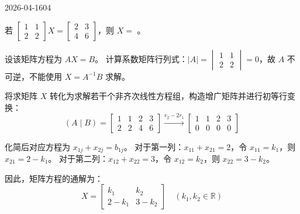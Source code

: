 \begin{mistake}{2026-04-16}{04}

\begin{problemcontent}
若 \(\begin{bmatrix} 1 & 1 \\ 2 & 2 \end{bmatrix} X = \begin{bmatrix} 2 & 3 \\ 4 & 6 \end{bmatrix}\)，则 \(X =\) \underline{\hspace{3cm}}。
\end{problemcontent}

\begin{solutioncontent}
设该矩阵方程为 \(AX=B\)。
计算系数矩阵行列式：\(|A| = \begin{vmatrix} 1 & 1 \\ 2 & 2 \end{vmatrix} = 0\)，故 \(A\) 不可逆，不能使用 \(X = A^{-1}B\) 求解。

将求矩阵 \(X\) 转化为求解若干个非齐次线性方程组，构造增广矩阵并进行初等行变换：
\[
(A \mid B) = \left[\begin{array}{cc|cc}
1 & 1 & 2 & 3 \\
2 & 2 & 4 & 6
\end{array}\right]
\xrightarrow{r_2 - 2r_1}
\left[\begin{array}{cc|cc}
1 & 1 & 2 & 3 \\
0 & 0 & 0 & 0
\end{array}\right]
\]

化简后对应方程为 \(x_{1j} + x_{2j} = b_{1j}\)。
对于第一列：\(x_{11} + x_{21} = 2\)，令 \(x_{11} = k_1\)，则 \(x_{21} = 2 - k_1\)。
对于第二列：\(x_{12} + x_{22} = 3\)，令 \(x_{12} = k_2\)，则 \(x_{22} = 3 - k_2\)。

因此，矩阵方程的通解为：
\[
X = \begin{bmatrix} k_1 & k_2 \\ 2-k_1 & 3-k_2 \end{bmatrix} \quad (k_1, k_2 \in \mathbb{R})
\]
\end{solutioncontent}


\end{mistake}

